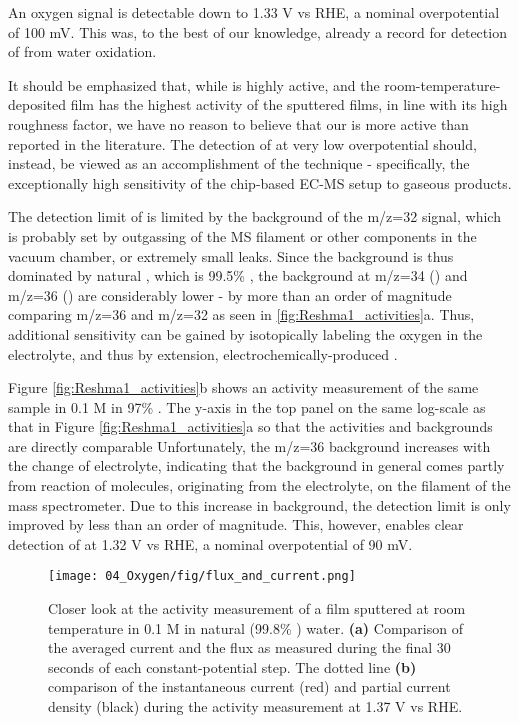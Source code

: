 An oxygen signal is detectable down to 1.33 V vs RHE, a nominal overpotential of 100 mV. This was, to the best of our knowledge, already a record for detection of  from water oxidation. 

It should be emphasized that, while  is highly active, and the room-temperature-deposited film has the highest activity of the sputtered films, in line with its high roughness factor, we have no reason to believe that our  is more active than  reported in the literature. The detection of  at very low overpotential should, instead, be viewed as an accomplishment of the technique - specifically, the exceptionally high sensitivity of the chip-based EC-MS setup to gaseous products.

The detection limit of  is limited by the background of the m/z=32 signal, which is probably set by outgassing of the MS filament or other components in the vacuum chamber, or extremely small leaks. Since the background is thus dominated by natural , which is 99.5\% , the background at m/z=34 () and m/z=36 () are considerably lower - by more than an order of magnitude comparing m/z=36 and m/z=32 as seen in \ref{fig:Reshma1_activities}a. Thus, additional sensitivity can be gained by isotopically labeling the oxygen in the electrolyte, and thus by extension, electrochemically-produced .

Figure \ref{fig:Reshma1_activities}b shows an activity measurement of the same sample in 0.1 M  in 97\% . The y-axis in the top panel on the same log-scale as that in Figure \ref{fig:Reshma1_activities}a so that the activities and backgrounds are directly comparable Unfortunately, the m/z=36 background increases with the change of electrolyte, indicating that the  background in general comes partly from reaction of  molecules, originating from the electrolyte, on the filament of the mass spectrometer. Due to this increase in background, the  detection limit is only improved by less than an order of magnitude. This, however, enables clear detection of  at 1.32 V vs RHE, a nominal overpotential of 90 mV.

\begin{figure}[h!]
	\texttt{[image: 04\_Oxygen/fig/flux\_and\_current.png]}
	\caption{Closer look at the activity measurement of a  film sputtered at room temperature in 0.1 M  in  natural (99.8\% ) water. \textbf{(a)} Comparison of the averaged current and the  flux as measured during the final 30 seconds of each constant-potential step. The dotted line  \textbf{(b)} comparison of the instantaneous current (red) and  partial current density (black) during the activity measurement at 1.37 V vs RHE.}
	\label{fig:flux_and_current}
\end{figure}

